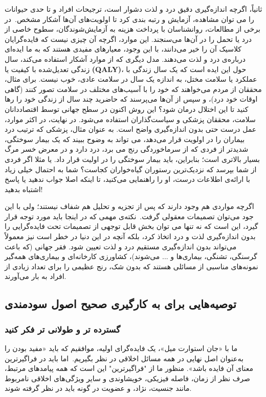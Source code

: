 ثانیاً، اگرچه اندازه‌گیری دقیق درد و لذت دشوار است، ترجیحات افراد و تا حدی حیوانات را می توان مشاهده، آزمایش و رتبه بندی کرد تا اولویت‌های آن‌ها آشکار مشخص.\     در برخی از مطالعات، روانشناسان با پرداخت هزینه به آزمایش‌شوندگان، سطوح خاصی از درد یا تحمل را در آن‌ها می‌سنجند.
این موارد، اگرچه آن چیزی نیست که فایده‌گرایان کلاسیک آن را خیر می‌دانند، با این وجود، معیارهای مفیدی هستند که به ما ایده‌ای درباره‌ی درد و لذت می‌دهند.
مدل دیگری که از موارد آشکار استفاده می‌کند، سال زندگی تعدیل‌شده با کیفیت یا \textenglish{\textbf{(QALY)}}، حول این ایده است که یک سال زندگی با عملکرد یا سلامت مختل، به اندازه یک سال در سلامت عادی، خوب نیست.
برای مثال، محققان از مردم می‌خواهند که خود را با آسیب‌های مختلف در سلامت تصور کنند (گاهی اوقات خود درد)، و سپس از آن‌ها می‌پرسند که حاضرید چند سال از زندگی خود را رها کنید تا این اختلال درمان شود؟ این روش اکنون در سطح جهانی توسط اقتصاددانان سلامت، محققان پزشکی و سیاست‌گذاران استفاده می‌شود.
در نهایت، در اکثر موارد، عمل درست حتی بدون اندازه‌گیری واضح است.
به عنوان مثال، پزشکی که ترتیب درد بیماران را در اولویت قرار می‌دهد، می تواند به وضوح ببیند که یک بیمار سوختگی، شدیدتر از فردی که از سرماخوردگی رنج می برد، درد دارد و در معرض خسر مرگ بسیار بالاتری است؛ بنابراین، باید بیمار سوختگی را در اولیت قرار داد.
یا مثلا اگر فردی از شما بپرسد که نزدیک‌ترین رستوران گیاه‌خواران کجاست؟ شما به احتمال خیلی زیاد با ارائه‌ی اطلاعات درست، او را راهنمایی می‌کنید، تا اینکه اصلا جواب ندهید یا پاسخ اشتباه بدهید!

اگرچه مواردی هم وجود دارند که پس از تجزیه و تحلیل هم شفاف نیستند؛ ولی با این جود می‌توان تصمیمات معقولی گرفت.\     نکته‌ی مهمی که در اینجا باید مورد توجه قرار گیرد، این است که نه تنها می توان بخش قابل توجهی از تصمیمات تحت فایده‌گرایی را بدون اندازه‌گیری لذت و درد اتخاذ کرد، بلکه آنچه در این دنیا در خطر است نیز معمولاً می‌تواند بدون اندازه‌گیری مستقیم درد و لذت تعیین شود.
فقر جهانی (که باعث گرسنگی، تشنگی، بیماری‌ها و ... می‌شوند)، کشاورزی کارخانه‌ای و بیماری‌های همه‌گیر نمونه‌های مناسبی از مسائلی هستند که بدون شک، رنج عظیمی را برای تعداد زیادی از افراد به بار می‌آورند.

\subsection*{توصیه‌هایی برای به کارگیری صحیح اصول سودمندی}
\label{subsec:توصیه‌هایی برای به کارگیری صحیح اصول سودمندی}


\subsubsection*{گسترده تر و طولانی تر فکر کنید}
\label{subsubsec:گسترده تر و طولانی تر فکر کنید}
ما با «جان استوارت میل»، یک فایده‌گرای اولیه، موافقیم که باید «مفید بودن را به‌عنوان اصل نهایی در همه مسائل اخلاقی در نظر بگیریم.\     اما باید در فراگیرترین معنای آن فایده باشد».
منظور ما از "فراگیرترین" این است که همه پیامدهای مرتبط، صرف نظر از زمان، فاصله فیزیکی، خویشاوندی و سایر ویژگی‌های اخلاقی نامربوط مانند جنسیت، نژاد، و عضویت در گونه باید در نظر گرفته شوند.


